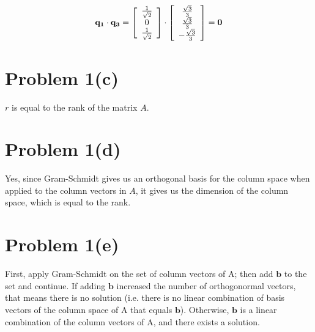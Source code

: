 \documentclass{article}
\begin{document}
$$
\mathbf{q_1} \cdot \mathbf{q_3} = 
\left[ \begin{array} {*{3}c} 
    \frac{1}{\sqrt{2}} \\
    0 \\
    \frac{1}{\sqrt{2}} \\
\end{array}\right] 
\cdot 
\left[ \begin{array} {*{3}c} 
    \frac{\sqrt{3}}{3} \\
    \frac{\sqrt{3}}{3} \\
    - \frac{\sqrt{3}}{3} \\
\end{array}\right]
= \mathbf{0}
$$

\section*{Problem 1(c)}

$r$ is equal to the rank of the matrix $A$.

\section*{Problem 1(d)}

Yes, since Gram-Schmidt gives us an orthogonal basis for the column space when applied to the column vectors in $A$, it gives us the dimension of the column space, which is equal to the rank.

\section*{Problem 1(e)}

First, apply Gram-Schmidt on the set of column vectors of A; then add $\mathbf{b}$ to the set and continue. If adding $\mathbf{b}$ increased the number of orthogonormal vectors, that means there is no solution (i.e. there is no linear combination of basis vectors of the column space of A that equals $\mathbf{b}$). Otherwise, $\mathbf{b}$ is a linear combination of the column vectors of A, and there exists a solution.

\end{document}
